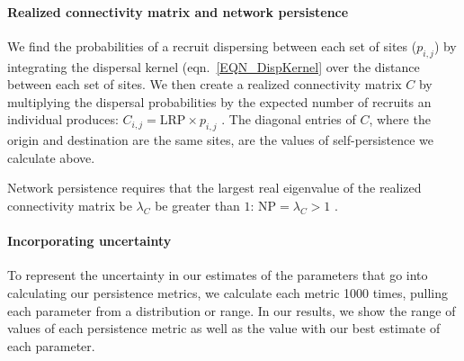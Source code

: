 \documentclass[12pt, oneside]{article}   	%
\begin{document}



\paragraph*{Realized connectivity matrix and network persistence}
We find the probabilities of a recruit dispersing between each set of sites ($p_{i,j}$) by integrating the dispersal kernel (eqn.\ \ref{EQN_DispKernel} over the distance between each set of sites. We then create a realized connectivity matrix $C$ by multiplying the dispersal probabilities by the expected number of recruits an individual produces: $C_{i,j} = \text{LRP} \times p_{i,j}$ \citep{burgess2014beyond}. The diagonal entries of $C$, where the origin and destination are the same sites, are the values of self-persistence we calculate above. 

Network persistence requires that the largest real eigenvalue of the realized connectivity matrix be $\lambda_C$ be greater than $1$: $\text{NP} = \lambda_C > 1$ \citep[e.g.][]{hastings_persistence_2006, white_population_2010, burgess2014beyond}.

\paragraph*{Incorporating uncertainty}
To represent the uncertainty in our estimates of the parameters that go into calculating our persistence metrics, we calculate each metric 1000 times, pulling each parameter from a distribution or range. In our results, we show the range of values of each persistence metric as well as the value with our best estimate of each parameter. 
\end{document}
